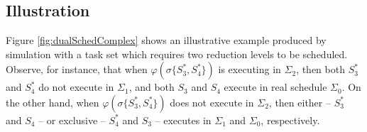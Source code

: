 \documentclass[twocolumn, compsocconf]{IEEEtran}
\newcommand{\dual}{\ensuremath{\varphi}}
\newcommand{\sched}{\ensuremath{\Sigma}\xspace}
\newcommand{\serv}{\ensuremath{\sigma}}
\begin{document}
\subsection{Illustration}\label{sec:illustration}

Figure \ref{fig:dualSchedComplex} shows an illustrative example produced by
simulation with a task set which requires two reduction levels to be
scheduled. Observe, for instance, that when $\dual(\serv\{ S_3^*, S_4^* \})$ is
executing in $\sched_2$, then both $S_3^*$ and $S_4^*$ do not execute in
$\sched_1$, and both $S_3$ and $S_4$ execute in real schedule $\sched_0$. On the
other hand, when $\dual(\serv\{ S_3^*, S_4^* \})$ does not execute in
$\sched_2$, then either -- $S_3^*$ and $S_4$ -- or exclusive -- $S_4^*$ and
$S_3$ -- executes in $\sched_1$ and $\sched_0$, respectively.
\end{document}

